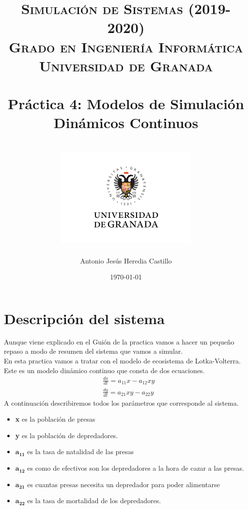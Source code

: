 \documentclass[12pt,a4paper]{article}
\title{
\normalfont \normalsize 
\textsc{{\bf Simulación de Sistemas (2019-2020)} \\ Grado en Ingeniería Informática \\ Universidad de Granada} \\ [25pt] %
\horrule{0.5pt} \\[0.4cm] %
\huge Práctica 4: Modelos de Simulación Dinámicos Continuos\\%
\horrule{2pt} \\[0.5cm] %
\includegraphics{images/logo.png}	
}
\author{Antonio Jesús Heredia Castillo} %
\date{\normalsize\today} %
\begin{document}
\maketitle %

\newpage
\tableofcontents %
\newpage %

\section{Descripción del sistema}

Aunque viene explicado en el Guión de la practica vamos a hacer un pequeño repaso a modo de resumen del sistema que vamos a simular. \\ En esta practica vamos a tratar con el modelo de ecosistema de Lotka-Volterra. Este es un modelo dinámico continuo que consta de dos ecuaciones. 
$$
\begin{aligned}
&\frac{d x}{d t}=a_{11} x-a_{12} x y\\
&\frac{d y}{d t}=a_{21} x y-a_{22} y
\end{aligned}
$$
A continuación describiremos todos los parámetros que corresponde al sistema.
\begin{itemize}
	\item \textbf{x} es la población de presas
	\item \textbf{y} es la población de depredadores.
	\item $\pmb{a_{11}}$ es la tasa de natalidad de las presas
	\item $\pmb{a_{12}}$ es como de efectivos son los depredadores a la hora de cazar a las presas. 
	\item $\pmb{a_{21}}$ es cuantas presas necesita un depredador para poder alimentarse
	\item $\pmb{a_{22}}$ es la tasa de mortalidad de los depredadores. 
\end{itemize}
\end{document}
